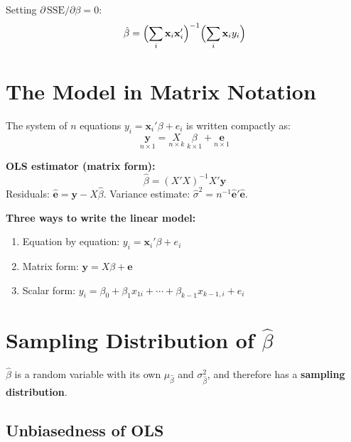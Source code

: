 Setting $\partial\,\text{SSE}/\partial\beta = 0$:
\begin{equation}
  \hat\beta = \Bigl(\sum_i\mathbf{x}_i\mathbf{x}_i'\Bigr)^{-1}
              \Bigl(\sum_i\mathbf{x}_i y_i\Bigr)
\end{equation}


\section{The Model in Matrix Notation}
\label{sec_MatrixNotation}

The system of $n$ equations $y_i = \mathbf{x}_i'\beta + e_i$ is written
compactly as:
\begin{equation}
  \underset{n\times1}{\mathbf{y}}
  = \underset{n\times k}{X}\;\underset{k\times1}{\beta}
  + \underset{n\times1}{\mathbf{e}}
\end{equation}

\begin{tcolorbox}[keyresult]
\textbf{OLS estimator (matrix form):}
\begin{equation}
  \hat\beta = (X'X)^{-1}X'\mathbf{y}
  \label{eq_OLS}
\end{equation}
Residuals: $\hat{\mathbf{e}} = \mathbf{y} - X\hat\beta$.\quad
Variance estimate: $\hat\sigma^2 = n^{-1}\hat{\mathbf{e}}'\hat{\mathbf{e}}$.
\end{tcolorbox}

\noindent\textbf{Three ways to write the linear model:}
\begin{enumerate}
  \item Equation by equation:\; $y_i = \mathbf{x}_i'\beta + e_i$
  \item Matrix form:\; $\mathbf{y} = X\beta + \mathbf{e}$
  \item Scalar form:\; $y_i = \beta_0 + \beta_1 x_{1i} + \cdots
    + \beta_{k-1}x_{k-1,i} + e_i$
\end{enumerate}


\section{Sampling Distribution of $\hat\beta$}
\label{sec_SamplingDist}

$\hat\beta$ is a random variable with its own $\mu_{\hat\beta}$ and
$\sigma^2_{\hat\beta}$, and therefore has a \textbf{sampling
distribution}.

\subsection{Unbiasedness of OLS}

